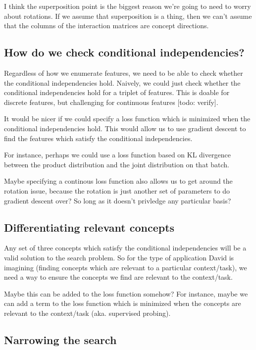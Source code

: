 \documentclass{article}
\begin{document}
I think the superposition point is the biggest reason we're going to need to worry about rotations. If we assume that superposition is a thing, then we can't assume that the columns of the interaction matrices are concept directions.

\subsection{How do we check conditional independencies?}

Regardless of how we enumerate features, we need to be able to check whether the conditional independencies hold. Naively, we could just check whether the conditional independencies hold for a triplet of features. This is doable for discrete features, but challenging for continuous features [todo: verify]. 

It would be nicer if we could specify a loss function which is minimized when the conditional independencies hold. This would allow us to use gradient descent to find the features which satisfy the conditional independencies.

For instance, perhaps we could use a loss function based on KL divergence between the product distribution and the joint distribution on that batch. 

Maybe specifying a continous loss function also allows us to get around the rotation issue, because the rotation is just another set of parameters to do gradient descent over? So long as it doesn't privledge any particular basis?

\subsection{Differentiating relevant concepts}

Any set of three concepts which satisfy the conditional independencies will be a valid solution to the search problem. So for the type of application David is imagining (finding concepts which are relevant to a particular context/task), we need a way to ensure the concepts we find are relevant to the context/task.

Maybe this can be added to the loss function somehow? For instance, maybe we can add a term to the loss function which is minimized when the concepts are relevant to the context/task (aka. supervised probing).

\subsection{Narrowing the search}
\end{document}
